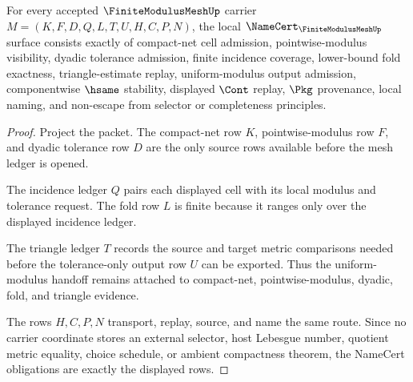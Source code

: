 \begin{theorem}
\label{thm:finite-modulus-mesh-namecert-obligations}
For every accepted $\FiniteModulusMeshUp$ carrier $M=(K,F,D,Q,L,T,U,H,C,P,N)$, the local $\NameCert_{\FiniteModulusMeshUp}$ surface consists exactly of compact-net cell admission, pointwise-modulus visibility, dyadic tolerance admission, finite incidence coverage, lower-bound fold exactness, triangle-estimate replay, uniform-modulus output admission, componentwise $\hsame$ stability, displayed $\Cont$ replay, $\Pkg$ provenance, local naming, and non-escape from selector or completeness principles.
\end{theorem}
\begin{proof}
Project the packet. The compact-net row $K$, pointwise-modulus row $F$, and dyadic tolerance row $D$ are the only source rows available before the mesh ledger is opened.

The incidence ledger $Q$ pairs each displayed cell with its local modulus and tolerance request. The fold row $L$ is finite because it ranges only over the displayed incidence ledger.

The triangle ledger $T$ records the source and target metric comparisons needed before the tolerance-only output row $U$ can be exported. Thus the uniform-modulus handoff remains attached to compact-net, pointwise-modulus, dyadic, fold, and triangle evidence.

The rows $H,C,P,N$ transport, replay, source, and name the same route. Since no carrier coordinate stores an external selector, host Lebesgue number, quotient metric equality, choice schedule, or ambient compactness theorem, the NameCert obligations are exactly the displayed rows.
\end{proof}


